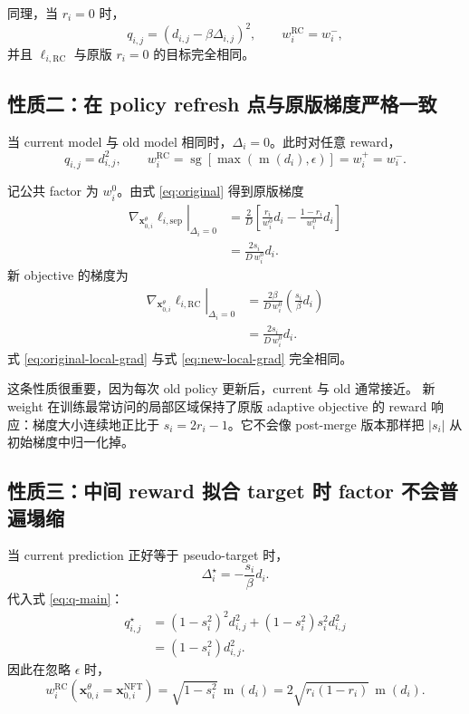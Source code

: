 \documentclass[11pt,a4paper]{article}
\newcommand{\sg}{\operatorname{sg}}
\newcommand{\mabs}{\operatorname{m}}
\newcommand{\xcur}{\mathbf{x}_{0,i}^{\theta}}
\newcommand{\xtarget}{\mathbf{x}_{0,i}^{\mathrm{NFT}}}
\newcommand{\eps}{\epsilon}
\newcommand{\R}{\mathrm{RC}}
\begin{document}
同理，当 $r_i=0$ 时，
\begin{equation}
q_{i,j}
=
\left(d_{i,j}-\beta\Delta_{i,j}\right)^2,
\qquad
w_i^{\R}=w_i^-,
\end{equation}
并且 $\ell_{i,\R}$ 与原版 $r_i=0$ 的目标完全相同。

\subsection{性质二：在 policy refresh 点与原版梯度严格一致}

当 current model 与 old model 相同时，$\Delta_i=0$。此时对任意 reward，
\begin{equation}
q_{i,j}=d_{i,j}^2,
\qquad
w_i^{\R}
=
\sg\!\left[\max\!\left(\mabs(d_i),\eps\right)\right]
=w_i^+=w_i^-.
\label{eq:refresh-weight}
\end{equation}

记公共 factor 为 $w_i^0$。由式 \eqref{eq:original} 得到原版梯度
\begin{align}
\left.
\nabla_{\xcur}\ell_{i,\mathrm{sep}}
\right|_{\Delta_i=0}
&=
\frac{2}{D}
\left[
\frac{r_i}{w_i^0}d_i
-
\frac{1-r_i}{w_i^0}d_i
\right]
\\
&=
\frac{2s_i}{D\,w_i^0}d_i.
\label{eq:original-local-grad}
\end{align}
新 objective 的梯度为
\begin{align}
\left.
\nabla_{\xcur}\ell_{i,\R}
\right|_{\Delta_i=0}
&=
\frac{2\beta}{D\,w_i^0}
\left(
\frac{s_i}{\beta}d_i
\right)
\\
&=
\frac{2s_i}{D\,w_i^0}d_i.
\label{eq:new-local-grad}
\end{align}
式 \eqref{eq:original-local-grad} 与式 \eqref{eq:new-local-grad} 完全相同。

这条性质很重要，因为每次 old policy 更新后，current 与 old 通常接近。
新 weight 在训练最常访问的局部区域保持了原版 adaptive objective 的
reward 响应：梯度大小连续地正比于 $s_i=2r_i-1$。它不会像 post-merge
版本那样把 $|s_i|$ 从初始梯度中归一化掉。

\subsection{性质三：中间 reward 拟合 target 时 factor 不会普遍塌缩}

当 current prediction 正好等于 pseudo-target 时，
\begin{equation}
\Delta_i^\star
=
-\frac{s_i}{\beta}d_i.
\end{equation}
代入式 \eqref{eq:q-main}：
\begin{align}
q_{i,j}^\star
&=
\left(1-s_i^2\right)^2d_{i,j}^2
+
\left(1-s_i^2\right)s_i^2d_{i,j}^2
\\
&=
\left(1-s_i^2\right)d_{i,j}^2.
\end{align}
因此在忽略 $\eps$ 时，
\begin{equation}
\boxed{
w_i^{\R}(\xcur=\xtarget)
=
\sqrt{1-s_i^2}\,\mabs(d_i)
=
2\sqrt{r_i(1-r_i)}\,\mabs(d_i).
}
\label{eq:target-scale}
\end{equation}
\end{document}
